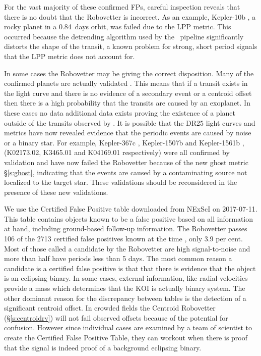 For the vast majority of these confirmed FPs, careful inspection reveals that there is no doubt that the Robovetter is incorrect. As an example, Kepler-10b \citep[][]{Batalha2011Kepler10,Fogtmann2014Kepler10}, a rocky planet in a 0.84~days orbit, was failed due to the LPP metric. This occurred because the detrending algorithm used by the \Kepler\ pipeline significantly distorts the shape of the transit, a known problem for strong, short period signals that the LPP metric does not account for.

In some cases the Robovetter may be giving the correct disposition.  Many of the confirmed planets are actually validated \citep{Morton2016,Rowe2014}. This means that if a transit exists in the light curve and there is no evidence of a secondary event or a centroid offset then there is a high probability that the transits are caused by an exoplanet. In these cases no data additional data exists proving the existence of a planet outside of the transits observed by \Kepler. It is possible that the DR25 light curves and metrics have now revealed evidence that the periodic events are caused by noise or a binary star. For example, Kepler-367c \citep{Rowe2014}, Kepler-1507b \citep{Morton2016} and Kepler-1561b \citep{Morton2016}, (K02173.02, K3465.01 and K04169.01 respectively) were all confirmed by validation and have now failed the Robovetter because of the new ghost metric \S\ref{s:ghost}, indicating that the events are caused by a contaminating source not localized to the target star.  These validations should be reconsidered in the presence of these new validations.


We use the Certified False Positive table downloaded from NExScI on 2017-07-11. This table contains objects known to be a false positive based on all information at hand, including ground-based follow-up information.  The Robovetter passes 106 of the 2713 certified false positives known at the time , only 3.9 per cent.  Most of those called a candidate by the Robovetter are high signal-to-noise and more than half have periods less than 5 days. The most common reason a candidate is a certified false positive is that that there is evidence that the object is an eclipsing binary. In some cases, external information, like radial velocities provide a mass which determines that the KOI is actually binary system. The other dominant reason for the discrepancy between tables is the detection of a significant centroid offset. In crowded fields the Centroid Robovetter (\S\ref{s:centroidrv}) will not fail observed offsets because of the potential for confusion. However since individual cases are examined by a team of scientist to create the Certified False Positive Table, they can workout when there is proof that the signal is indeed proof of a background eclipsing binary.  

